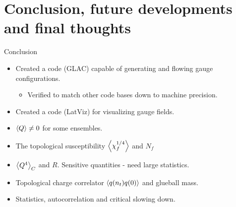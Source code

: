\documentclass[10pt,show notes on second screen]{beamer}
\begin{document}
\section{Conclusion, future developments and final thoughts}
\begin{frame}{Conclusion}
\begin{itemize}
    \item <1->Created a code (GLAC) capable of generating and flowing gauge configurations.
    \begin{itemize}
        \item <2->Verified to match other code bases down to machine precision.
    \end{itemize}
    \item <3->Created a code (LatViz) for visualizing gauge fields.
    \item <4->$\left\langle{Q}\right\rangle \neq 0$ for some ensembles. %
    \item <5->The topological susceptibility $\left\langle{\chi^{1/4}_f}\right\rangle$ and $N_f$ %
    \item <6->$\left\langle{Q^4}\right\rangle_C$ and $R$. Sensitive quantities - need large statistics.%
    \item <7->Topological charge correlator $\left\langle{q(n_t)q(0)}\right\rangle$ and glueball mass. %
    \item <8->Statistics, autocorrelation and critical slowing down.%
\end{itemize}
\end{frame}
\end{document}
